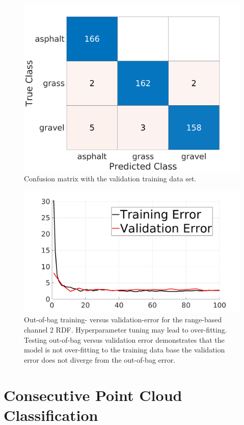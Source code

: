 \documentclass[numbered,pdftex]{ohio-etd}
\begin{document}
{{		\begin{figure}[H]
			\centering
			\includegraphics[width=0.65\linewidth]{Defense_Images/chan_2c_conf_VALIDATION_mat222}
			\caption[Validation Error]{Confusion matrix with the validation training data set.}
			\label{fig:vali_err_conf_mat_range}
		\end{figure}
	
		\begin{figure}[H]
			\centering
			\includegraphics[width=0.75\linewidth]{Defense_Images/train_vs_valid_overfit_test2}
			\caption[Training vs Validation Error]{Out-of-bag training- versus validation-error for the range-based channel 2 RDF. Hyperparameter tuning may lead to over-fitting. Testing out-of-bag versus validation error demonstrates that the model is not over-fitting to the training data base the validation error does not diverge from the out-of-bag error.}
			\label{fig:train_vs_valid_overfit_test2}
		\end{figure}
			


	} %
	


	\section{Consecutive Point Cloud Classification}\label{sec:consecutive_point_cloud_classification}{
	
}}
\end{document}
